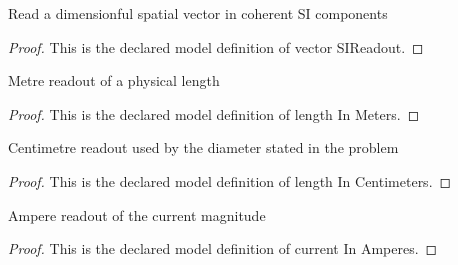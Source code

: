 \begin{definition}
  \label{def:physics:phyx-mini-0950:phyxminiproblems-problemphyxmini0950-vectorsireadout}
  Read a dimensionful spatial vector in coherent SI components
\end{definition}
\begin{proof}
  This is the declared model definition of vector SIReadout.
\end{proof}
\begin{definition}
  \label{def:physics:phyx-mini-0950:phyxminiproblems-problemphyxmini0950-lengthinmeters}
  Metre readout of a physical length
\end{definition}
\begin{proof}
  This is the declared model definition of length In Meters.
\end{proof}
\begin{definition}
  \label{def:physics:phyx-mini-0950:phyxminiproblems-problemphyxmini0950-lengthincentimeters}
  Centimetre readout used by the diameter stated in the problem
\end{definition}
\begin{proof}
  This is the declared model definition of length In Centimeters.
\end{proof}
\begin{definition}
  \label{def:physics:phyx-mini-0950:phyxminiproblems-problemphyxmini0950-currentinamperes}
  Ampere readout of the current magnitude
\end{definition}
\begin{proof}
  This is the declared model definition of current In Amperes.
\end{proof}
